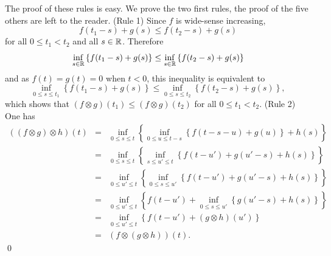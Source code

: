 The proof of these rules is easy. We prove the two first rules, the proof of the five others are
left to the reader.
\pr (Rule 1) Since $f$ is wide-sense increasing,
$$ f(t_1-s) + g(s) \leq f(t_2-s) + g(s) $$
for all $0 \leq t_1 < t_2$ and all $s \in \mathbb{R}$. Therefore
$$ \inf_{s \in \mathbb{R}} \left\{ f(t_1-s) + g(s) \right\} \leq \inf_{s \in \mathbb{R}} \left\{ f(t_2-s) + g(s) \right\} $$
and as $f(t) = g(t) = 0$ when $t < 0$, this inequality is equivalent to
$$ \inf_{0 \leq s \leq t_1} \left\{ f(t_1-s) + g(s) \right\} \leq \inf_{0 \leq s \leq t_2} \left\{ f(t_2-s) + g(s) \right\}, $$
which shows that $(f \otimes g)(t_1) \leq (f \otimes g)(t_2)$ for all $0 \leq t_1 < t_2$.
\vspace{1ex}
\noindent
(Rule 2) One has
\begin{eqnarray*}
((f \otimes g) \otimes h)(t)
& = & \inf_{0 \leq s \leq t} \left\{ \inf_{0 \leq u \leq t-s}
        \left\{ f(t-s-u) + g(u) \right\} + h(s) \right\} \\
& = & \inf_{0 \leq s \leq t} \left\{ \inf_{s \leq u' \leq t} \left\{ f(t-u') + g(u'-s) + h(s) \right\} \right\} \\
& = & \inf_{0 \leq u' \leq t} \left\{ \inf_{0 \leq s \leq u'} \left\{ f(t-u') + g(u'-s) + h(s) \right\} \right\}  \\
& = & \inf_{0 \leq u' \leq t} \left\{  f(t-u') + \inf_{0 \leq s \leq u'} \left\{ g(u'-s) + h(s) \right\} \right\}  \\
& = & \inf_{0 \leq u' \leq t} \left\{  f(t-u') + (g \otimes h)(u') \right\}  \\
& = & (f \otimes (g \otimes h))(t).
\end{eqnarray*}
\qed

